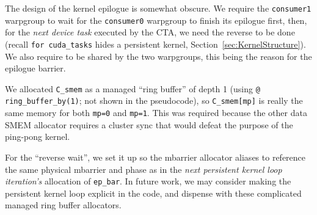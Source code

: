 The design of the kernel epilogue is somewhat obscure.
We require the \texttt{consumer1} warpgroup to wait for the \texttt{consumer0} warpgroup to finish its epilogue first,
then, for the \emph{next device task} executed by the CTA,
we need the reverse to be done
(recall \texttt{for cuda\_tasks} hides a persistent kernel, Section~\ref{sec:KernelStructure}).
We also require  to be shared by the two warpgroups,
this being the reason for the epilogue barrier.

We allocated \texttt{C\_smem} as a managed ``ring buffer'' of depth 1
(using \texttt{@ ring\_buffer\_by(1)}; not shown in the pseudocode),
so \texttt{C\_smem[mp]} is really the same memory for both \texttt{mp=0} and \texttt{mp=1}.
This was required because the other data SMEM allocator
requires a cluster sync that would defeat the purpose of the ping-pong kernel.

For the ``reverse wait'',
we set it up so the mbarrier allocator aliases 
to reference the same physical mbarrier and phase as
 in the \emph{next persistent kernel loop iteration's}
allocation of \texttt{ep\_bar}.
In future work,
we may consider making the persistent kernel loop explicit in the code,
and dispense with these complicated managed ring buffer allocators.
